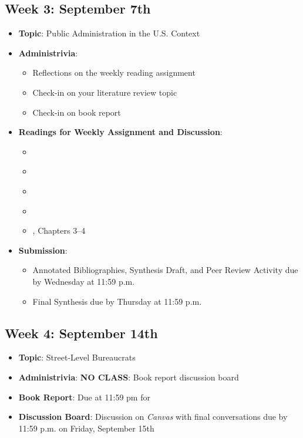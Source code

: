 \documentclass[12pt, letterpaper]{article}
\begin{document}
\subsection*{Week 3: September 7th}
    \begin{itemize}
        \item \textbf{Topic}: Public Administration in the U.S. Context
        \item \textbf{Administrivia}:
            \begin{itemize}
                \item Reflections on the weekly reading assignment
                \item Check-in on your literature review topic
                \item Check-in on book report
            \end{itemize}
        \item \textbf{Readings for Weekly Assignment and Discussion}:
            \begin{itemize}
                \item \cite{Allison1990}
                \item \cite{Kaufman1969}
                \item \cite{Kettl2020a}
                \item \cite{Overeem2005}
                \item \cite{Denhardt2015}, Chapters 3--4
            \end{itemize}
        \item \textbf{Submission}: 
            \begin{itemize}
                \item Annotated Bibliographies, Synthesis Draft, and Peer Review Activity due by Wednesday at 11:59 p.m. 
                \item Final Synthesis due by Thursday at 11:59 p.m.
            \end{itemize}
    \end{itemize}

\subsection*{Week 4: September 14th} 
    \begin{itemize}
        \item \textbf{Topic}: Street-Level Bureaucrats
        \item \textbf{Administrivia}: \textbf{NO CLASS}: Book report discussion board
        \item \textbf{Book Report}: Due at 11:59 pm for \cite{Lipsky2010} 
        \item \textbf{Discussion Board}: Discussion on \textit{Canvas} with final conversations due by 11:59 p.m. on Friday, September 15th
    \end{itemize}
\end{document}
